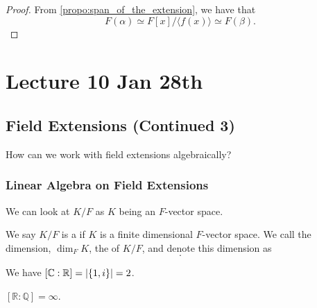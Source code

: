 \documentclass[notoc,notitlepage,nobib]{tufte-book}
\begin{document}
\begin{proof}
  From \cref{propo:span_of_the_extension}, we have that
  \begin{equation*}
    F(\alpha) \simeq F[x] / \langle f(x) \rangle \simeq F(\beta).
  \end{equation*}
\end{proof}



\chapter{Lecture 10 Jan 28th}%
\label{chp:lecture_10_jan_28th}

\section{Field Extensions (Continued 3)}%
\label{sec:field_extensions_continued_3}

How can we work with field extensions algebraically?

\subsection{Linear Algebra on Field Extensions}%
\label{sub:linear_algebra_on_field_extensions}

We can look at $K / F$ as $K$ being an $F$-vector space.

\begin{defn}\label{defn:finite_extension}
  We say $K / F$ is a  if $K$ is a finite dimensional $F$-vector space.
  We call the dimension, $\dim_F K$, the  of $K / F$, and denote this dimension as
  \begin{equation*}
    [ K : F ].
  \end{equation*}
\end{defn}

\begin{eg}
  We have $[ \mathbb{C} : \mathbb{R} ] = \left| \{ 1, i \} \right| = 2$.
\end{eg}

\begin{eg}
  $[ \mathbb{R} : \mathbb{Q} ] = \infty$.
\end{eg}
\end{document}
